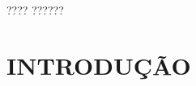 \documentclass[
	12pt,				%
    oneside,
	a4paper,			%
	chapter=TITLE,		%
	english,			%
	brazil				%
	]{abntex2}
\begin{document}

\listoffigures*
\cleardoublepage{}

\listoftables*
\cleardoublepage{}

\begin{siglas}
  \item[????] ??????%
\end{siglas}


\tableofcontents*
\cleardoublepage{}



\textual{}
\chapter{INTRODUÇÃO}
\label{chapter:introducao}


\end{document}
